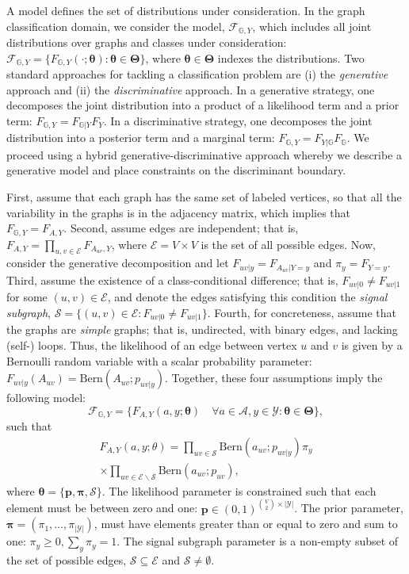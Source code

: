 \documentclass[10pt,journal,cspaper,compsoc]{IEEEtran}
\providecommand{\ve}[1]{\boldsymbol{#1}}
\newcommand{\GG}{\mathbb{G}}
\newcommand{\bth}{\ve{\theta}}
\newcommand{\bTh}{\ve{\Theta}}
\providecommand{\mc}[1]{\mathcal{#1}}
\providecommand{\mb}[1]{\boldsymbol{#1}}
\begin{document}
A model defines the set of distributions under consideration.  In the graph classification domain, we consider the model, $\mc{F}_{\GG,Y}$, which includes all joint distributions over graphs and classes under consideration: $\mc{F}_{\GG,Y}=\{F_{\GG, Y}(\cdot; \bth) : \bth \in \bTh\}$, where $\bth \in \bTh$ indexes the distributions.  Two standard approaches for tackling a classification problem are (i) the \emph{generative} approach and (ii) the \emph{discriminative} approach.  In a generative strategy, one decomposes the joint distribution into a product of a likelihood term and a prior term:  $F_{\GG,Y}=F_{\GG | Y}F_Y$.  In a discriminative strategy, one decomposes the joint distribution into a posterior term and a marginal term: $F_{\GG,Y}=F_{Y | \GG}F_{\GG}$.  We proceed using a hybrid generative-discriminative approach whereby we describe a generative model and place constraints on the discriminant boundary.

First,  assume that each graph has the same set of labeled vertices, so that all the variability in the graphs is in the adjacency matrix, which implies that $F_{\GG,Y}=F_{A,Y}$. Second, assume edges are independent; that is, $F_{A,Y}=\prod_{u,v \in \mc{E}} F_{A_{uv},Y}$, where 
$\mc{E}=V \times V$ is the set of all possible edges.  Now, consider the generative decomposition and let $F_{uv|y}=F_{A_{uv} | Y=y}$ and $\pi_y=F_{Y=y}$.  Third, assume the existence of a class-conditional difference; that is, $F_{uv|0} \neq F_{uv|1}$ for some $(u,v) \in \mc{E}$, and denote the edges satisfying this condition  the \emph{signal subgraph}, $\mc{S}=\{(u,v) \in \mc{E}: F_{uv|0} \neq F_{uv|1}\}$.  Fourth, for concreteness, assume that the graphs are \emph{simple} graphs; that is, undirected, with binary edges, and lacking (self-) loops.  Thus, the likelihood of an edge between vertex $u$ and $v$ is given by a Bernoulli random variable with a scalar probability parameter:  $F_{uv|y}(A_{uv})=\text{Bern}(A_{uv}; p_{uv|y})$. Together, these four assumptions imply the following model: 
\begin{equation}
\mc{F}_{\GG,Y}=\{F_{A, Y}(a,y; \bth) \quad \forall a\in\mc{A},y\in\mc{Y}: \bth \in \bTh\},
\end{equation} 
such that
\begin{multline}
F_{A,Y}(a,y; \theta) =  \prod_{uv \in \mc{S}} \text{Bern}(a_{uv}; p_{uv|y})  \pi_y 
\\ \times \prod_{uv \in \mc{E} \backslash \mc{S}} \text{Bern}(a_{uv}; p_{uv}),
\end{multline}
where $\bth=\{\mb{p},\mb{\pi},\mc{S}\}$. The likelihood parameter is constrained such that each element must be between zero and one: $\mb{p}\in (0,1)^{\binom{V}{2} \times |\mc{Y}|}$.  The prior parameter, $\mb{\pi}=(\pi_1, \ldots, \pi_{|\mc{Y}|})$, must have elements greater than or equal to zero and sum to one: $\pi_y \geq 0, \sum_y \pi_y=1$.  The signal subgraph parameter is a non-empty subset of the set of possible edges, $\mc{S} \subseteq \mc{E}$ and $\mc{S} \neq \emptyset$.
\end{document}
